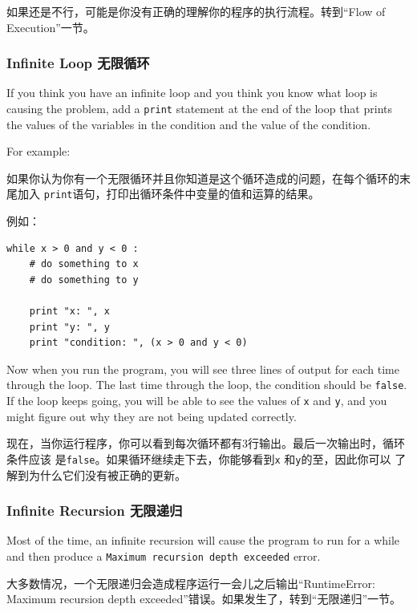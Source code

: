 \documentclass[10pt]{book}
\begin{document}
\begin{CJK}{UTF8}{gbsn}
\begin{itemize}
如果还是不行，可能是你没有正确的理解你的程序的执行流程。转到``Flow of Execution''一节。

\end{itemize}


\subsubsection{Infinite Loop 无限循环}

If you think you have an infinite loop and you think you know
what loop is causing the problem, add a {\tt print} statement at
the end of the loop that prints the values of the variables in
the condition and the value of the condition.

For example:

如果你认为你有一个无限循环并且你知道是这个循环造成的问题，在每个循环的末尾加入
{\tt print}语句，打印出循环条件中变量的值和运算的结果。

例如：

\begin{verbatim}
while x > 0 and y < 0 :
    # do something to x
    # do something to y

    print "x: ", x
    print "y: ", y
    print "condition: ", (x > 0 and y < 0)
\end{verbatim}
%
Now when you run the program, you will see three lines of output
for each time through the loop.  The last time through the
loop, the condition should be {\tt false}.  If the loop keeps
going, you will be able to see the values of {\tt x} and {\tt y},
and you might figure out why they are not being updated correctly.

现在，当你运行程序，你可以看到每次循环都有3行输出。最后一次输出时，循环条件应该
是{\tt false}。如果循环继续走下去，你能够看到{\tt x} 和{\tt y}的至，因此你可以
了解到为什么它们没有被正确的更新。

\subsubsection{Infinite Recursion 无限递归}

Most of the time, an infinite recursion will cause the program to run
for a while and then produce a {\tt Maximum recursion depth exceeded}
error.

大多数情况，一个无限递归会造成程序运行一会儿之后输出``RuntimeError: Maximum
recursion depth exceeded''错误。如果发生了，转到``无限递归''一节。


\end{CJK}
\end{document}
